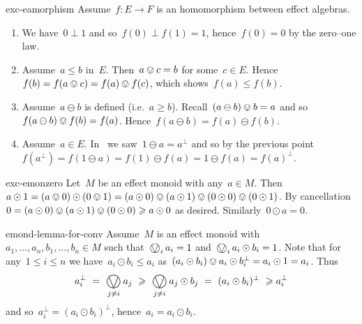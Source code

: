 \begin{solution}{exc-eamorphism}%
   Assume~$f\colon E \to F$ is an homomorphism between effect algebras.
    \begin{enumerate}
        \item
            We have~$0\perp 1$ and so~$f(0) \perp f(1) = 1$,
                hence~$f(0) = 0$ by the zero--one law.
        \item
            Assume~$a \leq b$ in~$E$.
            Then~$a \ovee c = b$ for some~$c \in E$.
            Hence~$f(b) = f(a \ovee c) = f(a) \ovee f(c)$,
            which shows~$f(a) \leq f(b)$.
        \item
            Assume~$a \ominus b$ is defined (i.e.~$a \geq b$).
            Recall~$(a \ominus b) \ovee b = a$
                and so~$f(a \ominus b) \ovee f(b) = f(a)$.
                Hence~$f(a \ominus b) = f(a) \ominus f(b)$.
        \item
            Assume~$a \in E$.
            In~ we saw~$1 \ominus a = a^\perp$
            and so by the previous point~$f(a^\perp) = f(1\ominus a) =
                f(1) \ominus f(a) = 1 \ominus f(a) = f(a)^\perp$.
    \end{enumerate}
\end{solution}
\spacingfix{}
\begin{solution}{exc-emonzero}%
    Let~$M$ be an effect monoid with any~$a \in M$.
    Then~$a \odot 1 = (a \ovee 0) \odot (0 \ovee 1 )
        = (a \odot 0) \ovee (a \odot 1) \ovee (0 \odot 0) \ovee (0 \odot 1)$.
    By cancellation~$
        0 = (a \odot 0) \ovee (a \odot 1) \ovee (0 \odot 0) \geq a\odot 0$
            as desired.
    Similarly~$0 \odot a = 0$.
\end{solution}
\begin{solution}{emond-lemma-for-conv}%
   Assume~$M$ is an effect monoid with~$a_1,\ldots,a_n,b_1, \ldots, b_n \in M$
        such that~$\bigovee_i a_i = 1$ and~$\bigovee_i a_i \odot b_i = 1$.
Note that for any~$1 \leq i \leq n$
    we have~$a_i \odot b_i \leq a_i$
        as~$(a_i \odot b_i) \ovee a_i \odot b_i^\perp = a_i \odot 1 = a_i$.
Thus
\begin{equation*}
    a_i^\perp
    \ = \ \bigovee_{j \neq i} a_j
    \ \geq \ \bigovee_{j \neq i} a_j \odot b_j
    \ = \ (a_i \odot b_i)^\perp
    \ \geq a_i^\perp
\end{equation*}
    and so~$a_i^\perp = (a_i \odot b_i)^\perp$,
        hence~$a_i = a_i \odot b_i$.
\end{solution}
